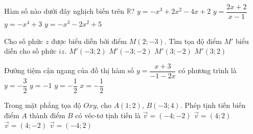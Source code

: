 \begin{ex}%
Hàm số nào dưới đây nghịch biến trên $\mathbb{R}$?
\choice
{\True $y=-x^3+2x^2-4x+2$}
{$y=\dfrac{2x+2}{x-1}$}
{$y=-x^4+3$}
{$y=-x^3-2x^2+5$}

\end{ex} 
 
\begin{ex}%
Cho số phức $z$ được biểu diễn bởi điểm $M(2;-3)$. Tìm tọa độ điểm $M'$ biểu diễn cho số phức $iz$.
\choice
{$M'(-3;2)$}
{$M'(-3;-2)$}
{$M'(3;-2)$}
{\True $M'(3;2)$}

\end{ex} 
 
\begin{ex}%
Đường tiệm cận ngang của đồ thị hàm số $y=\dfrac{x+3}{-1-2x}$ có phương trình là
\choice
{$y=-\dfrac{3}{2}$}
{$y=-1$}
{\True $y=-\dfrac{1}{2}$}
{$x=-\dfrac{1}{2}$}

\end{ex} 
 
\begin{ex}%
Trong mặt phẳng tọa độ $Oxy$, cho $A(1;2)$, $B(-3;4)$. Phép tịnh tiến biến điểm $A$ thành điểm $B$ có véc-tơ tịnh tiến là	
\choice
{$\vec{v}=(-4;-2)$}
{$\vec{v}=(4;2)$}
{$\vec{v}=(4;-2)$}
{\True $\vec{v}=(-4;2)$}

\end{ex} 
 
